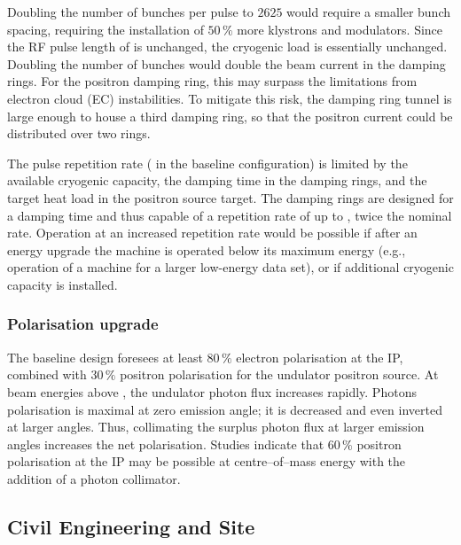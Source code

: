 Doubling the number of bunches per pulse to $2625$ would require a smaller bunch spacing, requiring  the installation of $50\,\%$ more klystrons and modulators. 
Since  the RF pulse length of  is unchanged, the cryogenic load is essentially unchanged.
Doubling the number of bunches would double the beam current in the damping rings.
For the positron damping ring, this may surpass the limitations from electron cloud (EC) instabilities. 
To mitigate this risk, the damping ring tunnel is large enough to house a third damping ring, so that the positron current could be distributed over two rings.

The pulse repetition rate ( in the baseline configuration) is limited by the available cryogenic capacity, the damping time in the damping rings, and the target heat load in the positron source target.
The damping rings are designed for a  damping time and thus capable of a repetition rate of up to , twice the nominal rate.
Operation at an increased repetition rate would be possible if after an energy upgrade the machine is operated below its maximum energy (e.g.,  operation of a  machine for a larger low-energy data set), or if additional cryogenic capacity is installed.

\subsubsection{Polarisation upgrade}
\label{subsubsec:upg-optP}

The baseline design foresees at least $80\,\%$ electron polarisation at the IP, combined with $30\,\%$ positron polarisation for the undulator positron source.
At beam energies above , the undulator photon flux increases rapidly. 
Photons polarisation is maximal at zero emission angle; it is decreased and even inverted at larger angles.
Thus, collimating the surplus photon flux at larger emission angles increases the net polarisation. 
Studies indicate that $60\,\%$ positron polarisation at the IP may be possible at  centre--of--mass energy with the addition of a photon collimator.
 



\subsection{Civil Engineering and Site}


